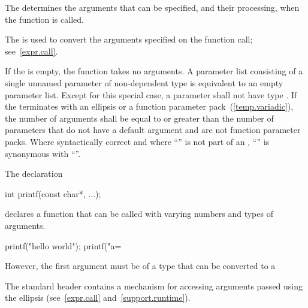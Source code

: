 \pnum
{}%
The
determines the arguments that can be specified, and their processing, when the function is called.
\begin{note}
%
The
is used to convert the arguments specified on the function call;
see~\ref{expr.call}.
\end{note}
%
If the
is empty, the function takes no arguments.
A parameter list consisting of a single unnamed parameter of
non-dependent type  is equivalent to an empty parameter
list.
%
Except for this special case, a parameter shall not have type 
.
If the
%
%
%
%
%
terminates with an ellipsis or a function parameter
pack~(\ref{temp.variadic}), the number of arguments shall be equal
to or greater than the number of parameters that do not have a default
argument and are not function parameter packs.
Where syntactically correct and where ``'' is not
part of an ,
``''
is synonymous with
``''.
\begin{example}
%
%
The declaration

\begin{codeblock}
int printf(const char*, ...);
\end{codeblock}

declares a function that can be called with varying numbers and types of arguments.

\begin{codeblock}
printf("hello world");
printf("a=%
\end{codeblock}

However, the first argument must be of a type
that can be converted to a
\end{example}
\begin{note}
The standard header
%
contains a mechanism for accessing arguments passed using the ellipsis
(see~\ref{expr.call} and~\ref{support.runtime}).
\end{note}

